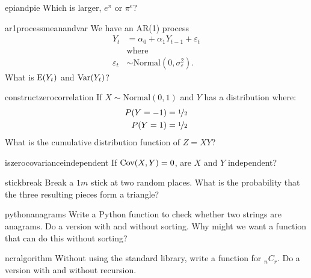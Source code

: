 \documentclass[a4paper]{article}
\begin{document}
\begin{question}{epiandpie}
Which is larger,
$e^\pi$
or
$\pi^e$?
\end{question}



\begin{question}{ar1processmeanandvar}
We have an AR(1) process
\begin{align*}
  Y_t &= \alpha_0 + \alpha_1 Y_{t-1} + \varepsilon_{t} \\
   & \text{where} \\
   \varepsilon_{t} &\sim \text{Normal}(0,\sigma_{\varepsilon}^2)
   \text{.}
\end{align*}
What is
$\operatorname{\mathrm{E}}(Y_t)$
and
$\operatorname{\mathrm{Var}}(Y_t)$?
\end{question}


\begin{question}{constructzerocorrelation}
If $X \sim \text{Normal}(0, 1)$ and $Y$ has a distribution where:
\begin{align*}
 P(Y=-1) &=  \nicefrac{1}{2} \\
 P(Y=1)  &=  \nicefrac{1}{2}
\end{align*}
What is the cumulative distribution function of $Z=XY$?
\end{question}


\begin{question}{iszerocovarianceindependent}
If $\operatorname{\mathrm{Cov}}(X,Y)=0$, are $X$ and $Y$ independent?
\end{question}


\begin{question}{stickbreak}
Break a  $1m$ stick at two random places.
What is the probability that the three resulting pieces form a triangle?
\end{question}


\begin{question}{pythonanagrams}
Write a Python function to check whether two strings are anagrams.
Do a version with and without sorting.
Why might we want a function that can do this without sorting?
\end{question}


\begin{question}{ncralgorithm}
Without using the standard library, write a function for ${}_nC_{r}$.
Do a version with and without recursion.
\end{question}
\end{document}
